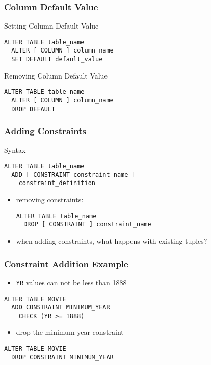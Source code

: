 \documentclass[dvipsnames]{beamer}
\theoremstyle{plain}
\begin{document}
\begin{frame}[fragile]
  \frametitle{Column Default Value}

  \begin{block}{Setting Column Default Value}
    \begin{lstlisting}
ALTER TABLE table_name
  ALTER [ COLUMN ] column_name
  SET DEFAULT default_value
    \end{lstlisting}
  \end{block}

  \begin{block}{Removing Column Default Value}
    \begin{lstlisting}
ALTER TABLE table_name
  ALTER [ COLUMN ] column_name
  DROP DEFAULT
    \end{lstlisting}
  \end{block}
  \medskip
\end{frame}

\begin{frame}[fragile]
  \frametitle{Adding Constraints}

  \begin{block}{Syntax}
    \begin{lstlisting}
ALTER TABLE table_name
  ADD [ CONSTRAINT constraint_name ]
    constraint_definition
    \end{lstlisting}
  \end{block}
  \begin{itemize}
   \item removing constraints:
    \begin{lstlisting}
ALTER TABLE table_name
  DROP [ CONSTRAINT ] constraint_name
    \end{lstlisting}

    \pause
    \item when adding constraints, what happens with existing tuples?
  \end{itemize}
\end{frame}

\begin{frame}[fragile]
  \frametitle{Constraint Addition Example}

  \begin{example}
    \begin{itemize}
      \item \texttt{YR} values can not be less than 1888
    \end{itemize}

    \begin{lstlisting}
ALTER TABLE MOVIE
  ADD CONSTRAINT MINIMUM_YEAR
    CHECK (YR >= 1888)
    \end{lstlisting}

    \begin{itemize}
      \item drop the minimum year constraint
    \end{itemize}

    \begin{lstlisting}
ALTER TABLE MOVIE
  DROP CONSTRAINT MINIMUM_YEAR
    \end{lstlisting}
  \end{example}
\end{frame}
\end{document}
